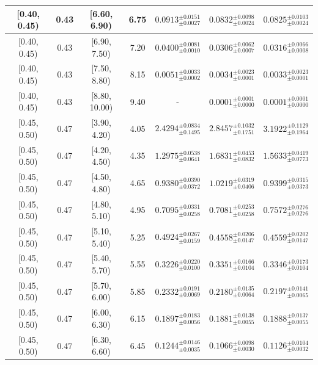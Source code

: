 \begin{longtable}{|c|c|c|c|c|c|c|}
[0.40, 0.45) & 0.43 & [6.60, 6.90) & 6.75 & $0.0913^{ \pm 0.0151 }_{ \pm 0.0027 }$ & $0.0832^{ \pm 0.0098 }_{ \pm 0.0024 }$ & $0.0825^{ \pm 0.0103 }_{ \pm 0.0024 }$ \\ 
\hline
[0.40, 0.45) & 0.43 & [6.90, 7.50) & 7.20 & $0.0400^{ \pm 0.0081 }_{ \pm 0.0010 }$ & $0.0306^{ \pm 0.0062 }_{ \pm 0.0007 }$ & $0.0316^{ \pm 0.0066 }_{ \pm 0.0008 }$ \\ 
\hline
[0.40, 0.45) & 0.43 & [7.50, 8.80) & 8.15 & $0.0051^{ \pm 0.0033 }_{ \pm 0.0002 }$ & $0.0034^{ \pm 0.0023 }_{ \pm 0.0001 }$ & $0.0033^{ \pm 0.0023 }_{ \pm 0.0001 }$ \\ 
\hline
[0.40, 0.45) & 0.43 & [8.80, 10.00) & 9.40 & - & $0.0001^{ \pm 0.0001 }_{ \pm 0.0000 }$ & $0.0001^{ \pm 0.0001 }_{ \pm 0.0000 }$ \\ 
\hline
[0.45, 0.50) & 0.47 & [3.90, 4.20) & 4.05 & $2.4294^{ \pm 0.0834 }_{ \pm 0.1495 }$ & $2.8457^{ \pm 0.1032 }_{ \pm 0.1751 }$ & $3.1922^{ \pm 0.1129 }_{ \pm 0.1964 }$ \\ 
\hline
[0.45, 0.50) & 0.47 & [4.20, 4.50) & 4.35 & $1.2975^{ \pm 0.0538 }_{ \pm 0.0641 }$ & $1.6831^{ \pm 0.0453 }_{ \pm 0.0832 }$ & $1.5633^{ \pm 0.0419 }_{ \pm 0.0773 }$ \\ 
\hline
[0.45, 0.50) & 0.47 & [4.50, 4.80) & 4.65 & $0.9380^{ \pm 0.0390 }_{ \pm 0.0372 }$ & $1.0219^{ \pm 0.0319 }_{ \pm 0.0406 }$ & $0.9399^{ \pm 0.0315 }_{ \pm 0.0373 }$ \\ 
\hline
[0.45, 0.50) & 0.47 & [4.80, 5.10) & 4.95 & $0.7095^{ \pm 0.0331 }_{ \pm 0.0258 }$ & $0.7081^{ \pm 0.0253 }_{ \pm 0.0258 }$ & $0.7572^{ \pm 0.0276 }_{ \pm 0.0276 }$ \\ 
\hline
[0.45, 0.50) & 0.47 & [5.10, 5.40) & 5.25 & $0.4924^{ \pm 0.0267 }_{ \pm 0.0159 }$ & $0.4558^{ \pm 0.0206 }_{ \pm 0.0147 }$ & $0.4559^{ \pm 0.0202 }_{ \pm 0.0147 }$ \\ 
\hline
[0.45, 0.50) & 0.47 & [5.40, 5.70) & 5.55 & $0.3226^{ \pm 0.0220 }_{ \pm 0.0100 }$ & $0.3351^{ \pm 0.0166 }_{ \pm 0.0104 }$ & $0.3346^{ \pm 0.0173 }_{ \pm 0.0104 }$ \\ 
\hline
[0.45, 0.50) & 0.47 & [5.70, 6.00) & 5.85 & $0.2332^{ \pm 0.0191 }_{ \pm 0.0069 }$ & $0.2180^{ \pm 0.0135 }_{ \pm 0.0064 }$ & $0.2197^{ \pm 0.0141 }_{ \pm 0.0065 }$ \\ 
\hline
[0.45, 0.50) & 0.47 & [6.00, 6.30) & 6.15 & $0.1897^{ \pm 0.0183 }_{ \pm 0.0056 }$ & $0.1881^{ \pm 0.0138 }_{ \pm 0.0055 }$ & $0.1888^{ \pm 0.0137 }_{ \pm 0.0055 }$ \\ 
\hline
[0.45, 0.50) & 0.47 & [6.30, 6.60) & 6.45 & $0.1244^{ \pm 0.0146 }_{ \pm 0.0035 }$ & $0.1066^{ \pm 0.0098 }_{ \pm 0.0030 }$ & $0.1126^{ \pm 0.0104 }_{ \pm 0.0032 }$ \\ 

\end{longtable}
